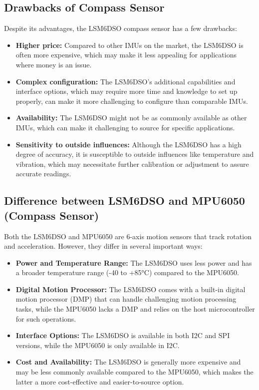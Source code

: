 \documentclass[
12pt,
oneside, 
onehalfspacing, 
nolistspacing, 
parskip, 
chapterinoneline, 
]{AASTCOMPUTER}
\begin{document}
\subsection*{Drawbacks of Compass Sensor}
Despite its advantages, the LSM6DSO compass sensor has a few drawbacks:

\begin{itemize}
  \item \textbf{Higher price:} Compared to other IMUs on the market, the LSM6DSO is often more expensive, which may make it less appealing for applications where money is an issue.
  \item \textbf{Complex configuration:} The LSM6DSO's additional capabilities and interface options, which may require more time and knowledge to set up properly, can make it more challenging to configure than comparable IMUs.
  \item \textbf{Availability:} The LSM6DSO might not be as commonly available as other IMUs, which can make it challenging to source for specific applications.
  \item \textbf{Sensitivity to outside influences:} Although the LSM6DSO has a high degree of accuracy, it is susceptible to outside influences like temperature and vibration, which may necessitate further calibration or adjustment to assure accurate readings.
\end{itemize}

\subsection*{Difference between LSM6DSO and MPU6050 (Compass Sensor)}
Both the LSM6DSO and MPU6050 are 6-axis motion sensors that track rotation and acceleration. However, they differ in several important ways:

\begin{itemize}
  \item \textbf{Power and Temperature Range:} The LSM6DSO uses less power and has a broader temperature range (-40 to +85°C) compared to the MPU6050.
  \item \textbf{Digital Motion Processor:} The LSM6DSO comes with a built-in digital motion processor (DMP) that can handle challenging motion processing tasks, while the MPU6050 lacks a DMP and relies on the host microcontroller for such operations.
  \item \textbf{Interface Options:} The LSM6DSO is available in both I2C and SPI versions, while the MPU6050 is only available in I2C.
  \item \textbf{Cost and Availability:} The LSM6DSO is generally more expensive and may be less commonly available compared to the MPU6050, which makes the latter a more cost-effective and easier-to-source option.
\end{itemize}
\end{document}

